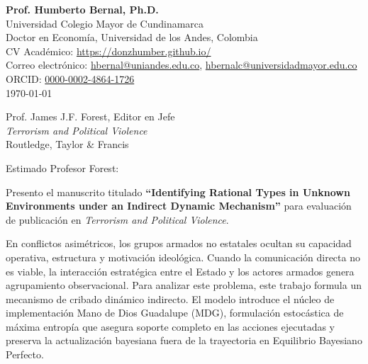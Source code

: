 \documentclass[11pt]{article}
\begin{document}
\singlespacing

\begin{flushright}
\textbf{Prof. Humberto Bernal, Ph.D.} \\
Universidad Colegio Mayor de Cundinamarca \\
Doctor en Economía, Universidad de los Andes, Colombia \\
CV Académico: \url{https://donzhumber.github.io/} \\
Correo electrónico: \href{mailto:hbernal@uniandes.edu.co}{hbernal@uniandes.edu.co}, \href{mailto:hbernalc@universidadmayor.edu.co}{hbernalc@universidadmayor.edu.co} \\
ORCID: \href{https://orcid.org/0000-0002-4864-1726}{0000-0002-4864-1726} \\
\today
\end{flushright}

\vspace{0.8em}

\begin{flushleft}
Prof. James J.F. Forest, Editor en Jefe \\
\textit{Terrorism and Political Violence} \\
Routledge, Taylor \& Francis
\end{flushleft}

\vspace{0.8em}

\noindent Estimado Profesor Forest:

\vspace{0.5em}

\noindent Presento el manuscrito titulado \textbf{``Identifying Rational Types in Unknown Environments under an Indirect Dynamic Mechanism''} para evaluación de publicación en \textit{Terrorism and Political Violence}.

\vspace{0.5em}

\noindent En conflictos asimétricos, los grupos armados no estatales ocultan su capacidad operativa, estructura y motivación ideológica. Cuando la comunicación directa no es viable, la interacción estratégica entre el Estado y los actores armados genera agrupamiento observacional. Para analizar este problema, este trabajo formula un mecanismo de cribado dinámico indirecto. El modelo introduce el núcleo de implementación Mano de Dios Guadalupe (MDG), formulación estocástica de máxima entropía que asegura soporte completo en las acciones ejecutadas y preserva la actualización bayesiana fuera de la trayectoria en Equilibrio Bayesiano Perfecto.
\end{document}
